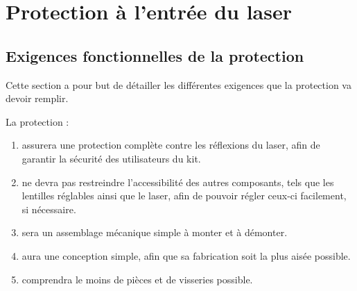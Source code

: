 \newpage
\section{Protection à l'entrée du laser}
\subsection{Exigences fonctionnelles de la protection}
Cette section a pour but de détailler les différentes exigences que la protection va devoir remplir.

La protection :
\begin{enumerate}
    \item assurera une protection complète contre les réflexions du laser, afin de garantir la sécurité des utilisateurs du kit.
    \item ne devra pas restreindre l'accessibilité des autres composants, tels que les lentilles réglables ainsi que le laser, afin de pouvoir régler ceux-ci facilement, si nécessaire.
    \item sera un assemblage mécanique simple à monter et à démonter.
    \item aura une conception simple, afin que sa fabrication soit la plus aisée possible.
    \item comprendra le moins de pièces et de visseries possible.
\end{enumerate}

